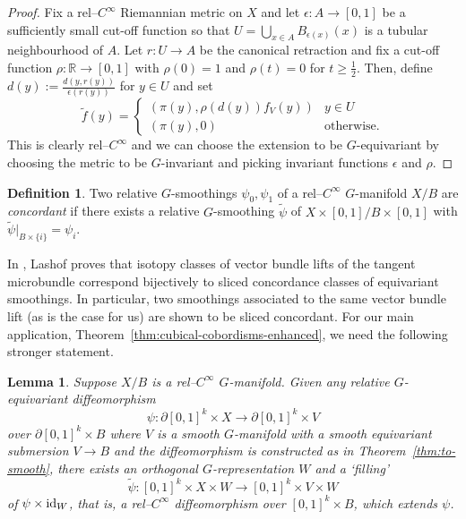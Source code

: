 \documentclass[11pt,psamsfonts, oneside, reqno]{amsart}
\newcommand{\union}[2]{\bigcup\limits_{#1}{#2}}%
\newcommand{\cl}{\colon}
\newcommand{\ide}{\normalfont\text{id}}
\newcommand{\del}{\partial}
\newcommand{\bR}{\mathbb{R}}
\newcommand{\wt}{\widetilde}
\newtheorem{lemma}[theorem]{Lemma}
\theoremstyle{definition}
\newtheorem{definition}[theorem]{Definition}
\theoremstyle{remark}
\numberwithin{equation}{section}
\begin{document}
\begin{proof}
 Fix a rel--$C^\infty$ Riemannian metric on $X$ and let $\epsilon \cl A\to [0,1]$ be a sufficiently small cut-off function so that $U = \union{x\in A}{B_{\epsilon(x)}(x)}$ is a tubular neighbourhood of $A$. Let $r \cl U\to A$ be the canonical retraction and fix a cut-off function $\rho \cl \bR\to [0,1]$ with $\rho(0) = 1$ and $\rho(t) = 0$ for $t \ge \frac12$. Then, define $d(y) := \frac{d(y,r(y))}{\epsilon(r(y))}$ for $y \in U$ and set 
 $$\wt f(y) =\begin{cases} (\pi(y),\rho(d(y))f_V(y)) & y\in U\\
 	(\pi(y),0)\quad & \text{otherwise}.\end{cases}$$
 \noindent This is clearly rel--$C^\infty$ and we can choose the extension to be $G$-equivariant by choosing the metric to be $G$-invariant and picking invariant functions $\epsilon$ and $\rho$.
\end{proof}

\begin{definition} Two relative $G$-smoothings $\psi_0,\psi_1$ of a rel--$C^\infty$ $G$-manifold $X/B$ are \emph{concordant} if there exists a relative $G$-smoothing $\wt\psi$ of $X\times[0,1]/B\times[0,1]$ with $\wt\psi|_{B\times\{i\}} = \psi_i$.
\end{definition}

%

In \cite[Stable $G$-smoothing theory II]{Las79}, Lashof proves that isotopy classes of vector bundle lifts of the tangent microbundle correspond bijectively to sliced concordance classes of equivariant smoothings. In particular, two smoothings associated to the same vector bundle lift (as is the case for us) are shown to be sliced concordant. For our main application, Theorem~\ref{thm:cubical-cobordisms-enhanced}, we need the following stronger statement.

\begin{lemma}\label{lem:invariance-of-smoothing}
	Suppose $X/B$ is a rel--$C^\infty$ $G$-manifold. Given any relative $G$-equivariant diffeomorphism 
	\[\psi \cl \del[0,1]^k\times X\to \del[0,1]^k\times V\]
	over $\del[0,1]^k\times B$ where $V$ is a smooth $G$-manifold with a smooth equivariant submersion $V\to B$ and the diffeomorphism is constructed as in Theorem~\ref{thm:to-smooth}, there exists an orthogonal $G$-representation $W$ and a `filling' 
	\[\wt\psi \cl [0,1]^k\times X\times W\to [0,1]^k\times V\times W\]
	of $\psi\times\ide_W$, that is, a rel--$C^\infty$ diffeomorphism over $[0,1]^k\times B$, which extends $\psi$.
\end{lemma}
\end{document}
